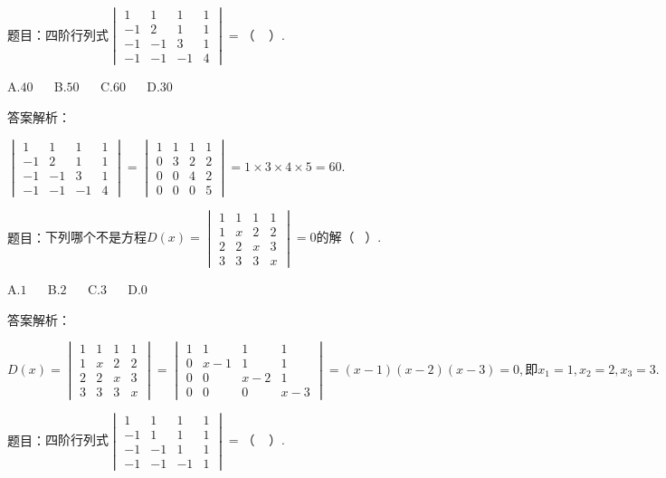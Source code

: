 题目：$\mathrm{四阶行列式}\begin{vmatrix}1&1&1&1\\-1&2&1&1\\-1&-1&3&1\\-1&-1&-1&4\end{vmatrix}=（\;\;\;\;）.\;$

A.$40$ $\quad$ B.$50$ $\quad$ C.$60$ $\quad$ D.$30$

答案解析：

$\begin{vmatrix}1&1&1&1\\-1&2&1&1\\-1&-1&3&1\\-1&-1&-1&4\end{vmatrix}=\begin{vmatrix}1&1&1&1\\0&3&2&2\\0&0&4&2\\0&0&0&5\end{vmatrix}=1\times3\times4\times5=60.$



题目：$\mathrm{下列哪个不是方程}D\left(x\right)=\begin{vmatrix}1&1&1&1\\1&x&2&2\\2&2&x&3\\3&3&3&x\end{vmatrix}=0\mathrm{的解}（\;\;\;）.$

A.$1$ $\quad$ B.$2$ $\quad$ C.$3$ $\quad$ D.$0$

答案解析：

$D\left(x\right)=\begin{vmatrix}1&1&1&1\\1&x&2&2\\2&2&x&3\\3&3&3&x\end{vmatrix}=\begin{vmatrix}1&1&1&1\\0&x-1&1&1\\0&0&x-2&1\\0&0&0&x-3\end{vmatrix}=\left(x-1\right)\left(x-2\right)\left(x-3\right)=0,即x_1=1,x_2=2,x_3=3.$



题目：$\mathrm{四阶行列式}\begin{vmatrix}1&1&1&1\\-1&1&1&1\\-1&-1&1&1\\-1&-1&-1&1\end{vmatrix}=（\;\;\;\;）.\;$

